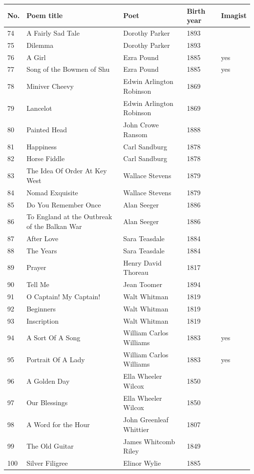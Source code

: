 \documentclass{book}
\begin{document}
\begin{table}[h!]
\tiny
\begin{tabular}{lllll}
\toprule
No. & Poem title & Poet & Birth year & Imagist \\
\midrule
74 & A Fairly Sad Tale & Dorothy Parker & 1893 \\
75 & Dilemma & Dorothy Parker & 1893 \\
76 & A Girl & Ezra Pound & 1885 & yes \\
77 & Song of the Bowmen of Shu & Ezra Pound & 1885 & yes \\
78 & Miniver Cheevy & Edwin Arlington Robinson & 1869 \\
79 & Lancelot & Edwin Arlington Robinson & 1869 \\
80 & Painted Head & John Crowe Ransom & 1888 \\
81 & Happiness & Carl Sandburg & 1878 \\
82 & Horse Fiddle & Carl Sandburg & 1878 \\
83 & The Idea Of Order At Key West & Wallace Stevens & 1879 \\
84 & Nomad Exquisite & Wallace Stevens & 1879 \\
85 & Do You Remember Once & Alan Seeger & 1886 \\
86 & To England at the Outbreak of the Balkan War & Alan Seeger & 1886 \\
87 & After Love & Sara Teasdale & 1884 \\
88 & The Years & Sara Teasdale & 1884 \\
89 & Prayer & Henry David Thoreau & 1817 \\
90 & Tell Me & Jean Toomer & 1894 \\
91 & O Captain! My Captain! & Walt Whitman & 1819 \\
92 & Beginners & Walt Whitman & 1819 \\
93 & Inscription & Walt Whitman & 1819 \\
94 & A Sort Of A Song & William Carlos Williams & 1883 & yes \\
95 & Portrait Of A Lady & William Carlos Williams & 1883 & yes \\
96 & A Golden Day & Ella Wheeler Wilcox & 1850 \\
97 & Our Blessings & Ella Wheeler Wilcox & 1850 \\
98 & A Word for the Hour & John Greenleaf Whittier & 1807 \\
99 & The Old Guitar & James Whitcomb Riley & 1849 \\
100 & Silver Filigree & Elinor Wylie & 1885 \\
\bottomrule
\end{tabular}
\end{table}
\end{document}
